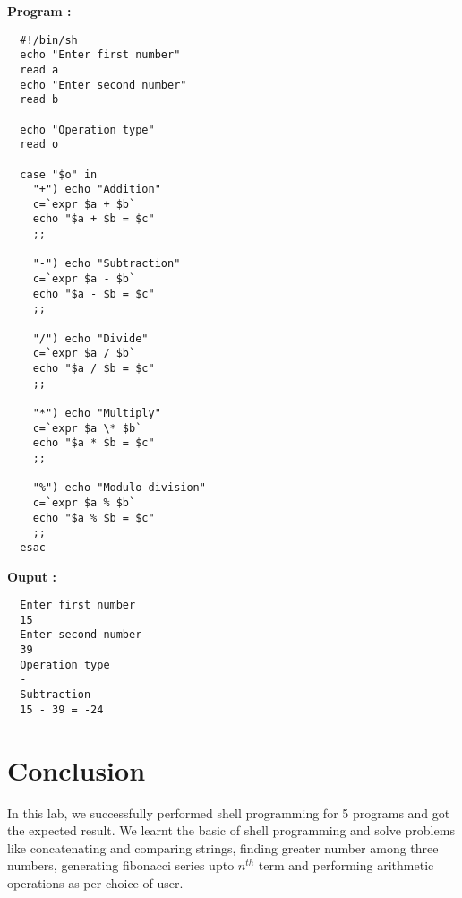\documentclass[journal,onecolumn]{IEEEtran}
\begin{document}
\textbf{Program : }
\begin{verbatim}
  #!/bin/sh
  echo "Enter first number"
  read a
  echo "Enter second number"
  read b

  echo "Operation type"
  read o

  case "$o" in 
    "+") echo "Addition"
    c=`expr $a + $b`
    echo "$a + $b = $c"
    ;;

    "-") echo "Subtraction"
    c=`expr $a - $b`
    echo "$a - $b = $c"
    ;;

    "/") echo "Divide"
    c=`expr $a / $b`
    echo "$a / $b = $c"
    ;;

    "*") echo "Multiply"
    c=`expr $a \* $b`
    echo "$a * $b = $c"
    ;;

    "%") echo "Modulo division"
    c=`expr $a % $b`
    echo "$a % $b = $c"
    ;;
  esac
\end{verbatim}

\textbf{Ouput : }
\begin{verbatim}
  Enter first number
  15
  Enter second number
  39
  Operation type
  -
  Subtraction
  15 - 39 = -24
\end{verbatim}














\section{Conclusion}
In this lab, we successfully performed shell programming for 5 programs and got the expected result. We learnt the basic of shell programming and solve problems like concatenating and comparing strings, finding greater number among three numbers, generating fibonacci series upto $n^{th}$ term and performing arithmetic operations as per choice of user.
\end{document}
